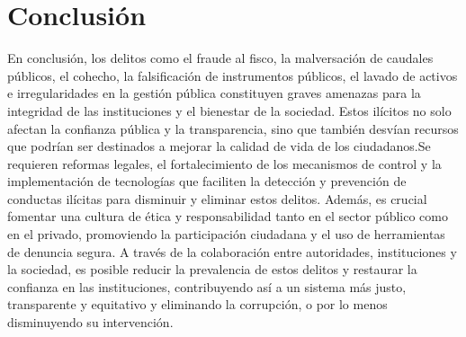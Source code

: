 \documentclass[letter,12pt]{article}
\begin{document}
	\section{Conclusión}
	En conclusión, los delitos como el fraude al fisco, la malversación de caudales públicos, el cohecho, la falsificación de instrumentos públicos, el lavado de activos e irregularidades en la gestión pública constituyen graves amenazas para la integridad de las instituciones y el bienestar de la sociedad. Estos ilícitos no solo afectan la confianza pública y la transparencia, sino que también desvían recursos que podrían ser destinados a mejorar la calidad de vida de los ciudadanos.Se requieren reformas legales, el fortalecimiento de los mecanismos de control y la implementación de tecnologías que faciliten la detección y prevención de conductas ilícitas para disminuir y eliminar estos delitos. Además, es crucial fomentar una cultura de ética y responsabilidad tanto en el sector público como en el privado, promoviendo la participación ciudadana y el uso de herramientas de denuncia segura. A través de la colaboración entre autoridades, instituciones y la sociedad, es posible reducir la prevalencia de estos delitos y restaurar la confianza en las instituciones, contribuyendo así a un sistema más justo, transparente y equitativo y eliminando la corrupción, o por lo menos disminuyendo su intervención.
\end{document}
